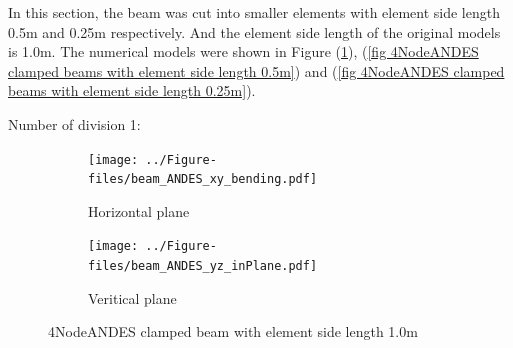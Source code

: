 \documentclass[fleqn,11pt]{article}
\begin{document}









% 




\newpage
In this section, the beam was cut into smaller elements with element side length 0.5m and 0.25m respectively. And the element side length of the original models is 1.0m. The numerical models were shown in Figure (\ref{fig 4NodeANDES clamped beams with element side length 1.0m}), (\ref{fig 4NodeANDES clamped beams with element side length 0.5m}) and (\ref{fig 4NodeANDES clamped beams with element side length 0.25m}). 

Number of division 1:

\begin{figure}[H]
  \centering
    \begin{subfigure}{0.5\textwidth}
      \centering
      \texttt{[image: ../Figure-files/beam\_ANDES\_xy\_bending.pdf]}
      \caption{Horizontal plane}
    \end{subfigure}
    \begin{subfigure}{0.5\textwidth}
      \centering
      \texttt{[image: ../Figure-files/beam\_ANDES\_yz\_inPlane.pdf]}
      \caption{Veritical  plane}
    \end{subfigure}
  \caption{4NodeANDES clamped beam with element side length 1.0m }
  \label{fig 4NodeANDES clamped beams with element side length 1.0m}
\end{figure}
\end{document}
